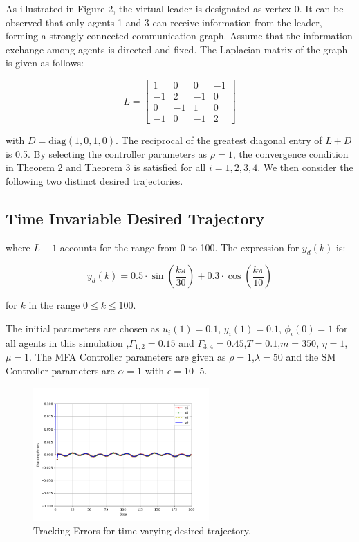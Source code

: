 \documentclass[journal,onecolumn]{IEEEtran}
\begin{document}
As illustrated in Figure 2, the virtual leader is designated as vertex 0. It can be observed that only agents 1 and 3 can receive information from the leader, forming a strongly connected communication graph. Assume that the information exchange among agents is directed and fixed. The Laplacian matrix of the graph is given as follows:

\[
    L = \begin{bmatrix}
    1 & 0 & 0 & -1 \\
    -1 & 2 & -1 & 0 \\
    0 & -1 & 1 & 0 \\
    -1 & 0 & -1 & 2
    \end{bmatrix}
\]

with \( D = \text{diag}(1, 0, 1, 0) \). The reciprocal of the greatest diagonal entry of \( L + D \) is 0.5. By selecting the controller parameters as \( \rho = 1 \), the convergence condition in Theorem 2 and Theorem 3 is satisfied for all \( i = 1, 2, 3, 4 \). We then consider the following two distinct desired trajectories.


\subsection{Time Invariable Desired Trajectory}

where \( L + 1 \) accounts for the range from 0 to 100. The expression for \( y_d(k) \) is:

\[
y_d(k) = 0.5 \cdot \sin\left(\frac{k \pi}{30}\right) + 0.3 \cdot \cos\left(\frac{k \pi}{10}\right)
\]

for \( k \) in the range \( 0 \leq k \leq 100 \).

The initial parameters are chosen as \(u_i(1)=0.1\), \(y_i(1)=0.1\), \(\phi_i(0)=1 \) for all agents in this simulation ,\(\Gamma_{1,2}=0.15\) and \(\Gamma_{3,4}=0.45\),\(T=0.1\),\(m=350\), \(\eta=1\),\(\mu=1\). The MFA Controller parameters are given as \(\rho=1\),\(\lambda=50\) and the SM Controller parameters are 
\(\alpha=1\) with \(\epsilon=10^-5\).
\begin{figure}[h!]
    \centering
    \includegraphics[width=0.6\textwidth]{Figure_2.png}
    \caption{Tracking Errors for time varying desired trajectory.}
    \label{fig:figure_2} %
\end{figure}
\end{document}
